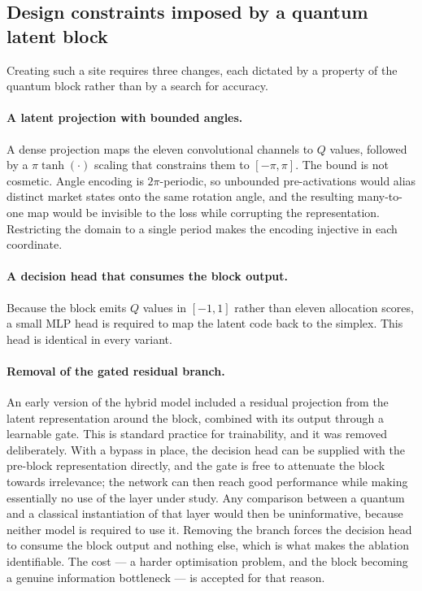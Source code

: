 \documentclass[aps,floatfix,superscriptaddress,twocolumn,tightenlines,amsmath,amssymb,nofootinbib,10pt,longbibliography,prl]{revtex4-2}
\begin{document}
\subsection{Design constraints imposed by a quantum latent block}
\label{subsec:design-constraints}

Creating such a site requires three changes, each dictated by a property of the
quantum block rather than by a search for accuracy.

\paragraph{A latent projection with bounded angles.}
A dense projection maps the eleven convolutional channels to $Q$ values,
followed by a $\pi\tanh(\cdot)$ scaling that constrains them to $[-\pi,\pi]$.
The bound is not cosmetic. Angle encoding is $2\pi$-periodic, so unbounded
pre-activations would alias distinct market states onto the same rotation angle,
and the resulting many-to-one map would be invisible to the loss while
corrupting the representation. Restricting the domain to a single period makes
the encoding injective in each coordinate.

\paragraph{A decision head that consumes the block output.}
Because the block emits $Q$ values in $[-1,1]$ rather than eleven allocation
scores, a small MLP head is required to map the latent code back to the
simplex. This head is identical in every variant.

\paragraph{Removal of the gated residual branch.}
An early version of the hybrid model included a residual projection from the
latent representation around the block, combined with its output through a
learnable gate. This is standard practice for trainability, and it was removed
deliberately. With a bypass in place, the decision head can be supplied with the
pre-block representation directly, and the gate is free to attenuate the block
towards irrelevance; the network can then reach good performance while making
essentially no use of the layer under study. Any comparison between a quantum
and a classical instantiation of that layer would then be uninformative, because
neither model is required to use it. Removing the branch forces the decision
head to consume the block output and nothing else, which is what makes the
ablation identifiable. The cost --- a harder optimisation problem, and the
block becoming a genuine information bottleneck --- is accepted for that reason.
\end{document}
